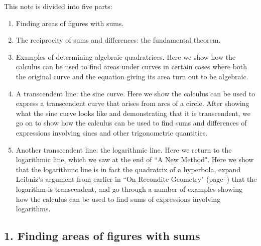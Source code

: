 \documentclass[polutonikogreek,english,twoside,openright]{article}
\begin{document}
\smallskip

This note is divided into five parts:
\vspace{-0.5em}
\begin{enumerate}
\itemsep0em
\item Finding areas of figures with sums.
\item The reciprocity of sums and differences: the fundamental
  theorem.
\item Examples of determining algebraic quadratrices.  Here we show
  how the calculus can be used to find areas under curves in certain
  cases where both the original curve and the equation giving its area
  turn out to be algebraic.
\item A transcendent line: the sine curve.  Here we show the calculus
  can be used to express a transcendent curve that arises from arcs of
  a circle.  After showing what the sine curve looks like and
  demonstrating that it is transcendent, we go on to show how the
  calculus can be used to find sums and differences of expressions
  involving sines and other trigonometric quantities.
\item Another transcendent line: the logarithmic line.  Here we return
  to the logarithmic line, which we saw at the end of ``A New Method".
  Here we show that the logarithmic line is in fact the quadratrix of
  a hyperbola, expand Leibniz's argument from earlier in ``On
  Recondite Geometry" (page~\pageref{logtrans}) that the logarithm is
  transcendent, and go through a number of examples showing how the
  calculus can be used to find sums of expressions involving
  logarithms.
\end{enumerate}

\subsection*{1. Finding areas of figures with sums}
\end{document}
